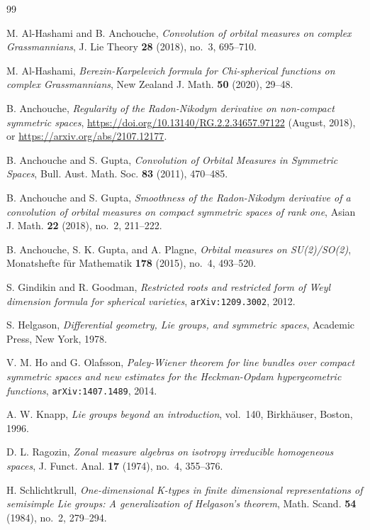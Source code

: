 \documentclass[11pt,a4paper]{amsart}
\theoremstyle{definition}
\numberwithin{equation}{section}
\begin{document}
 {

 \begin{thebibliography}{99}

M. Al-Hashami and B. Anchouche,
\emph{Convolution of orbital measures on complex Grassmannians},
J. Lie Theory \textbf{28} (2018), no.~3, 695--710.

M. Al-Hashami,
\emph{Berezin-Karpelevich formula for Chi-spherical functions on complex Grassmannians},
New Zealand J. Math. \textbf{50} (2020), 29--48.

B. Anchouche,
\emph{Regularity of the Radon-Nikodym derivative on non-compact symmetric spaces},
\url{https://doi.org/10.13140/RG.2.2.34657.97122} (August, 2018),
or \url{https://arxiv.org/abs/2107.12177}.



B. Anchouche and S. Gupta,
\emph{Convolution of Orbital Measures in Symmetric Spaces},
Bull. Aust. Math. Soc. \textbf{83} (2011), 470--485.

B. Anchouche and S. Gupta,
\emph{Smoothness of the Radon-Nikodym derivative of a convolution of orbital measures
on compact symmetric spaces of rank one},
Asian J. Math. \textbf{22} (2018), no.~2, 211--222.

B. Anchouche, S. K. Gupta, and A. Plagne,
\emph{Orbital measures on SU(2)/SO(2)},
Monatshefte f\"ur Mathematik \textbf{178} (2015), no.~4, 493--520.

S. Gindikin and R. Goodman,
\emph{Restricted roots and restricted form of Weyl dimension formula for spherical varieties},
\texttt{arXiv:1209.3002}, 2012.

S. Helgason,
\emph{Differential geometry, Lie groups, and symmetric spaces},
Academic Press, New York, 1978.

V. M. Ho and G. Olafsson,
\emph{Paley-Wiener theorem for line bundles over compact symmetric spaces and new estimates
for the Heckman-Opdam hypergeometric functions},
\texttt{arXiv:1407.1489}, 2014.

A. W. Knapp,
\emph{Lie groups beyond an introduction},
vol.~140, Birkh\"auser, Boston, 1996.

D. L. Ragozin,
\emph{Zonal measure algebras on isotropy irreducible homogeneous spaces},
J. Funct. Anal. \textbf{17} (1974), no.~4, 355--376.

H. Schlichtkrull,
\emph{One-dimensional K-types in finite dimensional representations of semisimple Lie groups:
A generalization of Helgason's theorem},
Math. Scand. \textbf{54} (1984), no.~2, 279--294.


\end{thebibliography}}
\end{document}
